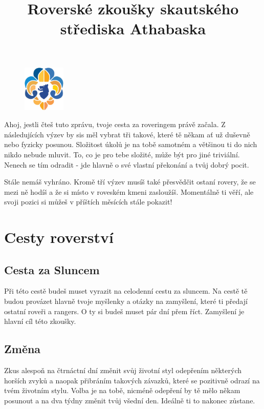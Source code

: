 \documentclass[11pt, fleqn]{article}
\title{Roverské zkoušky skautského střediska Athabaska}
\author{}
\date{}
\begin{document}
\maketitle{}
\vspace{-20pt}

\begin{figure}
  \vspace{-30pt}
  \begin{center}
    \includegraphics[width=0.18\textwidth]{logo.png}
  \end{center}
  \vspace{-20pt}
\end{figure}

Ahoj, jestli čteš tuto zprávu, tvoje cesta za roveringem právě začala.
Z následujících výzev by sis měl vybrat tři takové, které tě někam ať už duševně nebo fyzicky posunou. Složitost úkolů je na tobě samotném a většinou ti do nich nikdo nebude mluvit. To, co je pro tebe složité, může být pro jiné triviální. Nenech se tím odradit - jde hlavně o své vlastní překonání a tvůj dobrý pocit.

Stále nemáš vyhráno. Kromě tří výzev musíš také přesvědčit ostaní rovery, že se mezi ně hodíš a že si místo v roveském kmeni zasloužíš. Momentálně ti věří, ale svoji pozici si můžeš v příštích měsících stále pokazit!

\vspace{20pt}
\section*{Cesty roverství}
  \subsection*{Cesta za Sluncem}
  Při této cestě budeš muset vyrazit na celodenní cestu za sluncem. Na cestě tě budou provázet hlavně tvoje myšlenky a otázky na zamyšlení, které ti předají ostatní roveři a rangers. O ty si budeš muset pár dní přem říct. Zamyšlení je hlavní cíl této zkoušky.
  \subsection*{Změna}
  Zkus alespoň na čtrnáctní dní změnit svůj životní styl odepřením některých horších zvyků a naopak přibráním takových závazků, které se pozitivně odrazí na tvém životním stylu. Volba je na tobě, nicméně odepření by tě mělo někam posunout a na dva týdny změnit tvůj všední den. Ideálně ti to nakonec zůstane.
\end{document}
